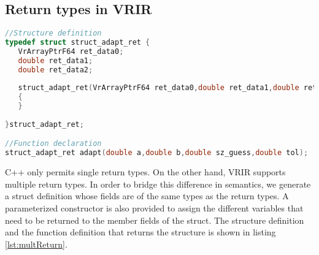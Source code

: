 \subsection{Return types in VRIR}
\begin{lstlisting}[language=c,caption={Generated structure to handle multiple returns.},label={lst:multReturn}]
//Structure definition
typedef struct struct_adapt_ret { 
   VrArrayPtrF64 ret_data0;
   double ret_data1;
   double ret_data2;
   
   struct_adapt_ret(VrArrayPtrF64 ret_data0,double ret_data1,double ret_data2) :ret_data0(ret_data0),ret_data1(ret_data1),ret_data2(ret_data2)
   {
   }
   
}struct_adapt_ret;

//Function declaration
struct_adapt_ret adapt(double a,double b,double sz_guess,double tol);
\end{lstlisting}
C++ only permits single return types. On the other hand, VRIR supports multiple return types. In order to bridge this difference in semantics, we generate a struct definition whose fields are of the same types as the return types. A parameterized constructor is also provided to assign the different variables that need to be returned to the member fields of the struct. The structure definition and the function definition that returns the structure is shown in listing \ref{lst:multReturn}.
